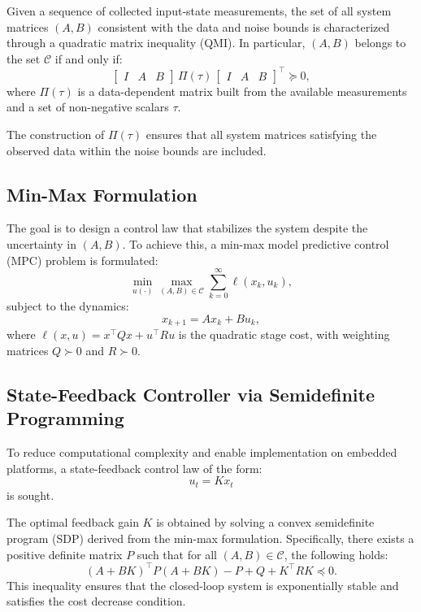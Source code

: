 Given a sequence of collected input-state measurements, the set of all system matrices \((A, B)\) consistent with the data and noise bounds is characterized through a quadratic matrix inequality (QMI).
In particular, \((A, B)\) belongs to the set \(\mathcal{C}\) if and only if:
\[
\begin{bmatrix} I & A & B \end{bmatrix} \, \Pi(\tau) \, \begin{bmatrix} I & A & B \end{bmatrix}^\top \succeq 0,
\]
where \(\Pi(\tau)\) is a data-dependent matrix built from the available measurements and a set of non-negative scalars \(\tau\).

The construction of \(\Pi(\tau)\) ensures that all system matrices satisfying the observed data within the noise bounds are included.

\subsection{Min-Max Formulation}

The goal is to design a control law that stabilizes the system despite the uncertainty in \((A, B)\).
To achieve this, a min-max model predictive control (MPC) problem is formulated:
\[
\min_{u(\cdot)} \max_{(A, B) \in \mathcal{C}} \sum_{k=0}^{\infty} \ell(x_k, u_k),
\]
subject to the dynamics:
\[
x_{k+1} = A x_k + B u_k,
\]
where \(\ell(x, u) = x^\top Q x + u^\top R u\) is the quadratic stage cost, with weighting matrices \(Q \succ 0\) and \(R \succ 0\).

\subsection{State-Feedback Controller via Semidefinite Programming}

To reduce computational complexity and enable implementation on embedded platforms, a state-feedback control law of the form:
\[
u_t = K x_t
\]
is sought.

The optimal feedback gain \(K\) is obtained by solving a convex semidefinite program (SDP) derived from the min-max formulation.
Specifically, there exists a positive definite matrix \(P\) such that for all \((A, B) \in \mathcal{C}\), the following holds:
\[
(A + B K)^\top P (A + B K) - P + Q + K^\top R K \preceq 0.
\]
This inequality ensures that the closed-loop system is exponentially stable and satisfies the cost decrease condition.

